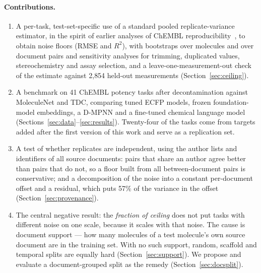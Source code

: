 \paragraph{Contributions.}
\begin{enumerate}[nosep]
\item A per-task, test-set-specific use of a standard pooled replicate-variance estimator, in the spirit of earlier analyses of ChEMBL reproducibility~\cite{kramer2012experimental,kalliokoski2013comparability}, to obtain noise floors (RMSE and $R^2$), with bootstraps over molecules and over document pairs and sensitivity analyses for trimming, duplicated values, stereochemistry and assay selection, and a leave-one-measurement-out check of the estimate against 2{,}854 held-out measurements (Section~\ref{sec:ceiling}).
\item A benchmark on 41 ChEMBL potency tasks after decontamination against MoleculeNet and TDC, comparing tuned ECFP models, frozen foundation-model embeddings, a D-MPNN and a fine-tuned chemical language model (Sections~\ref{sec:data}--\ref{sec:results}). Twenty-four of the tasks come from targets added after the first version of this work and serve as a replication set.
\item A test of whether replicates are independent, using the author lists and identifiers of all source documents: pairs that share an author agree better than pairs that do not, so a floor built from all between-document pairs is conservative; and a decomposition of the noise into a constant per-document offset and a residual, which puts 57\% of the variance in the offset (Section~\ref{sec:provenance}).
\item The central negative result: the \emph{fraction of ceiling} does not put tasks with different noise on one scale, because it scales with that noise. The cause is document support --- how many molecules of a test molecule's own source document are in the training set. With no such support, random, scaffold and temporal splits are equally hard (Section~\ref{sec:support}). We propose and evaluate a document-grouped split as the remedy (Section~\ref{sec:docsplit}).
\end{enumerate}

